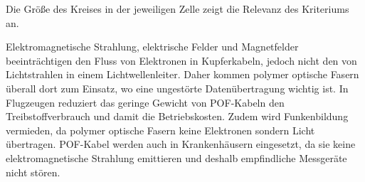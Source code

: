 
Die Größe des Kreises in der jeweiligen Zelle zeigt die Relevanz des Kriteriums
an.

Elektromagnetische Strahlung, elektrische Felder und Magnetfelder
beeinträchtigen den Fluss von Elektronen in Kupferkabeln, jedoch nicht den von
Lichtstrahlen in einem Lichtwellenleiter. Daher kommen polymer optische Fasern
überall dort zum Einsatz, wo eine ungestörte Datenübertragung wichtig ist. In
Flugzeugen reduziert das geringe Gewicht von POF-Kabeln den Treibstoffverbrauch
und damit die Betriebskosten. Zudem wird Funkenbildung vermieden, da polymer
optische Fasern keine Elektronen sondern Licht übertragen. POF-Kabel werden auch
in Krankenhäusern eingesetzt, da sie keine elektromagnetische Strahlung
emittieren und deshalb empfindliche Messgeräte nicht stören.
